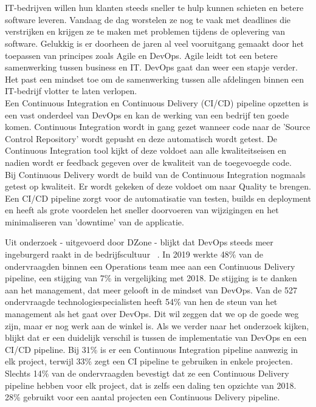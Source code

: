 
\chapter{}
\label{ch:inleiding}

IT-bedrijven willen hun klanten steeds sneller te hulp kunnen schieten en betere software leveren. Vandaag de dag worstelen ze nog te vaak met deadlines die verstrijken en krijgen ze te maken met problemen tijdens de oplevering van software. Gelukkig is er doorheen de jaren al veel vooruitgang gemaakt door het toepassen van principes zoals Agile en DevOps. Agile leidt tot een betere samenwerking tussen business en IT. DevOps gaat dan weer een stapje verder. Het past een mindset toe om de samenwerking tussen alle afdelingen binnen een IT-bedrijf vlotter te laten verlopen. \\
Een Continuous Integration en Continuous Delivery (CI/CD) pipeline opzetten is een vast onderdeel van DevOps en kan de werking van een bedrijf ten goede komen. Continuous Integration wordt in gang gezet wanneer code naar de 'Source Control Repository' wordt gepusht en deze automatisch wordt getest. De Continuous Integration tool kijkt of deze voldoet aan alle kwaliteitseisen en nadien wordt er feedback gegeven over de kwaliteit van de toegevoegde code.\\
Bij Continuous Delivery wordt de build van de Continuous Integration nogmaals getest op kwaliteit. Er wordt gekeken of deze voldoet om naar Quality te brengen. Een CI/CD pipeline zorgt voor de automatisatie van testen, builds en deployment en heeft als grote voordelen het sneller doorvoeren van wijzigingen en het minimaliseren van 'downtime' van de applicatie.

Uit onderzoek - uitgevoerd door DZone - blijkt dat DevOps steeds meer ingeburgerd raakt in de bedrijfscultuur ~\autocite{Baker2019}. In 2019 werkte 48\% van de ondervraagden binnen een Operations team mee aan een Continuous Delivery pipeline, een stijging van 7\% in vergelijking met 2018.
De stijging is te danken aan het management, dat meer gelooft in de mindset van DevOps. Van de 527 ondervraagde technologiespecialisten heeft 54\% van hen de steun van het management als het gaat over DevOps. Dit wil zeggen dat we op de goede weg zijn, maar er nog werk aan de winkel is.
Als we verder naar het onderzoek kijken, blijkt dat er een duidelijk verschil is tussen de implementatie van DevOps en een CI/CD pipeline. 
Bij 31\% is er een Continuous Integration pipeline aanwezig in elk project, terwijl 33\% zegt een CI pipeline te gebruiken in enkele projecten.
Slechts 14\% van de ondervraagden bevestigt dat ze een Continuous Delivery pipeline hebben voor elk project, dat is zelfs een daling ten opzichte van 2018.
28\% gebruikt voor een aantal projecten een Continuous Delivery pipeline.

